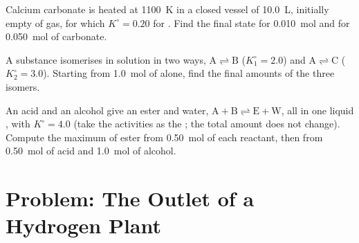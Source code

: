 \begin{exercise}[$\star\star\star$]\label{exo:b1:extent-q-and-k:10}
Calcium carbonate is heated at \qty{1100}{K} in a closed vessel of
\qty{10.0}{L}, initially empty of gas, for which $K^\circ = 0.20$ for
. Find the final state for
\qty{0.010}{mol} and for \qty{0.050}{mol} of carbonate.
\end{exercise}

\begin{exercise}[$\star\star\star$]\label{exo:b1:extent-q-and-k:11}
A substance  isomerises in solution in two ways, $\mathrm{A \rightleftharpoons B}$
($K_1^\circ = 2.0$) and $\mathrm{A \rightleftharpoons C}$ ($K_2^\circ = 3.0$). Starting from
\qty{1.0}{mol} of  alone, find the final amounts of the three
isomers.
\end{exercise}

\begin{exercise}[$\star\star\star$]\label{exo:b1:extent-q-and-k:12}
An acid  and an alcohol  give an ester and water, $\mathrm{A + B
\rightleftharpoons E + W}$, all in one liquid , with $K^\circ = 4.0$ (take the
activities as the ; the total amount does not change).
Compute the maximum  of ester from \qty{0.50}{mol} of each reactant,
then from \qty{0.50}{mol} of acid and \qty{1.0}{mol} of alcohol.
\end{exercise}

\section{Problem: The Outlet of a Hydrogen Plant}

